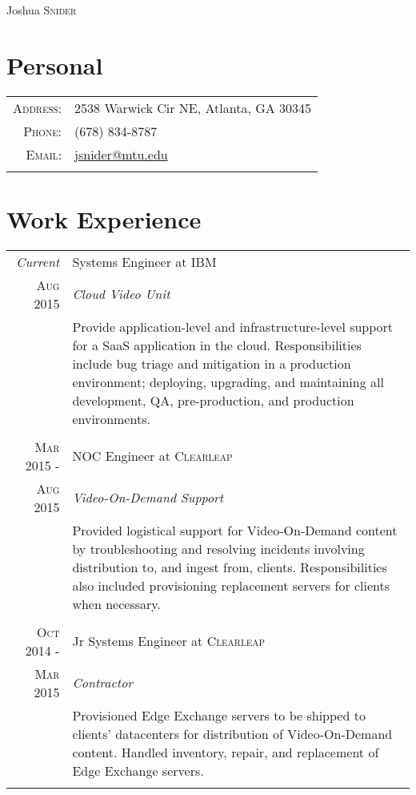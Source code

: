 \documentclass[a4paper,9pt]{extarticle}
\begin{document}
\pagestyle{empty}

\par{\centering
                {\Huge Joshua \textsc{Snider}
        }\bigskip\par}
\section{Personal}
\begin{tabular}{rl}
    \textsc{Address:}   & 2538 Warwick Cir NE, Atlanta, GA 30345\\
    \textsc{Phone:}     & (678) 834-8787\\
    \textsc{Email:}     & \href{mailto:jsnider@mtu.edu}{jsnider@mtu.edu}\\
    \multicolumn{2}{c}{}\\
\end{tabular}

\section{Work Experience}
\begin{tabular}{r|p{8.5cm}}
 \emph{Current}&Systems Engineer at \textsc{IBM}\\\textsc{Aug 2015}&\emph{Cloud Video Unit}\\&\footnotesize{Provide application-level and infrastructure-level support for a SaaS application in the cloud. Responsibilities include bug triage and mitigation in a production environment; deploying, upgrading, and maintaining all development, QA, pre-production, and production environments.}\\\multicolumn{2}{c}{}\\
 \textsc{Mar 2015 -}&NOC Engineer at \textsc{Clearleap}\\\textsc{Aug 2015}&\emph{Video-On-Demand Support}\\&\footnotesize{Provided logistical support for Video-On-Demand content by troubleshooting and resolving incidents involving distribution to, and ingest from, clients. Responsibilities also included provisioning replacement servers for clients when necessary.}\\\multicolumn{2}{c}{}\\
 \textsc{Oct 2014 -}&Jr Systems Engineer at \textsc{Clearleap}\\\textsc{Mar 2015}&\emph{Contractor}\\&\footnotesize{Provisioned Edge Exchange servers to be shipped to clients' datacenters for distribution of Video-On-Demand content. Handled inventory, repair, and replacement of Edge Exchange servers.}\\\multicolumn{2}{c}{}\\
\end{tabular}
\end{document}
